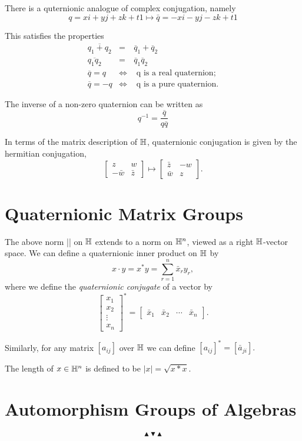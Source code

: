 There is a quternionic analogue of complex conjugation, namely
\[ q = xi + yj + zk +t1 \mapsto  \bar{q} = -xi - yj - zk +t1\]

This satisfies the properties
\begin{eqnarray*}
  \overline{q_1+q_2} &=& \overline{q}_1+\overline{q}_2 \\
  \overline{q_1q_2} &=& \overline{q}_1\overline{q}_2 \\
  \overline{q}=q &\Longleftrightarrow& \text{ q is a real quaternion}; \\
  \overline{q}=-q &\Longleftrightarrow& \text{ q is a pure quaternion}.
\end{eqnarray*}

The inverse of a non-zero quaternion can be written as
\[ q^{-1}=\frac{\overline{q}}{q\overline{q}} \]

In terms of the matrix description of \(\mathbb{H}\), quaternionic conjugation is given by the
hermitian conjugation,
\[
  \left[\begin{array}{cc}
      z & w \\
      -\bar{w} & \bar{z}
  \end{array}\right]
  \mapsto
  \left[\begin{array}{cc}
      \bar{z} & -w \\
      \bar{w} & z
  \end{array}\right].
\]

\section{Quaternionic Matrix Groups}
The above norm || on \(\mathbb{H}\) extends to a norm on \(\mathbb{H}^n\), viewed as a right \(\mathbb{H}\)-vector
space. We can define a quaternionic inner product on \(\mathbb{H}\) by
\[ x\cdot y=x^*y=\sum_{r=1}^n \bar{x}_ry_r, \]
where we define the {\it quaternionic conjugate} of a vector by
\[ \left[\begin{array}{c} x_1 \\ x_2 \\ \vdots \\ x_n \end{array}\right]^* = [\begin{array}{cccc} \bar{x}_1 & \bar{x}_2 & \cdots & \bar{x}_n \end{array}]. \]

Similarly, for any matrix \([a_{ij}]\) over \(\mathbb{H}\) we can define \([a_{ij}]^*=[\bar{a}_{ji}].\)

The length of \(x\in\mathbb{H}^n\) is defined to be \(|x|=\sqrt{x*x}\).

\section{Automorphism Groups of Algebras}

\[ \blacktriangle \blacktriangledown \blacktriangle \]

